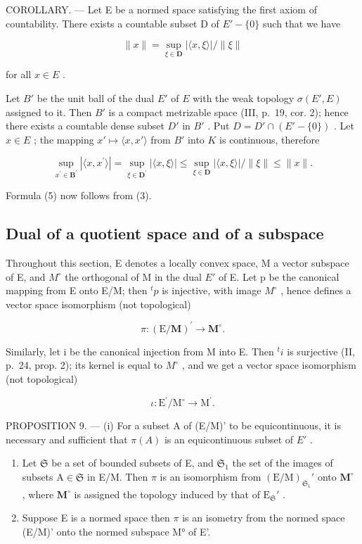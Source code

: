 COROLLARY. --- Let E be a normed space satisfying the first axiom of countability. There exists a countable subset D of \(E' - \{0\}\) such that we have

\[
\| x \| = \sup _ {\xi \in \mathbf {D}} | \langle x, \xi \rangle | / \| \xi \|\tag{5}
\]

for all \(x \in E\) .

Let \(B'\) be the unit ball of the dual \(E'\) of \(E\) with the weak topology \(\sigma(E', E)\) assigned to it. Then \(B'\) is a compact metrizable space (III, p.~19, cor. 2); hence there exists a countable dense subset \(D'\) in \(B'\) . Put \(D = D' \cap (E' - \{0\})\) . Let \(x \in E\) ; the mapping \(x' \mapsto \langle x, x' \rangle\) from \(B'\) into \(K\) is continuous, therefore

\[
\sup _ {x ^ {\prime} \in \mathbf {B} ^ {\prime}} | \langle x, x ^ {\prime} \rangle | = \sup _ {\xi \in \mathbf {D} ^ {\prime}} | \langle x, \xi \rangle | \leqslant \sup _ {\xi \in \mathbf {D}} | \langle x, \xi \rangle | / \| \xi \| \leqslant \| x \|.
\]

Formula (5) now follows from (3).

\subsection{Dual of a quotient space and of a subspace}

Throughout this section, E denotes a locally convex space, M a vector subspace of E, and \(M^{\circ}\) the orthogonal of M in the dual \(E'\) of E. Let p be the canonical mapping from E onto E/M; then \(^{t}p\) is injective, with image \(M^{\circ}\) , hence defines a vector space isomorphism (not topological)

\[
\pi : (\mathrm{E} / \mathbf {M}) ^ {\prime} \rightarrow \mathbf {M} ^ {\circ}.
\]

Similarly, let i be the canonical injection from M into E. Then \({}^{t}i\) is surjective (II, p.~24, prop. 2); its kernel is equal to \(M^{\circ}\) , and we get a vector space isomorphism (not topological)

\[
\iota : \mathrm{E} ^ {\prime} / \mathrm{M} ^ {\circ} \rightarrow \mathrm{M} ^ {\prime}.
\]

PROPOSITION 9. --- (i) For a subset A of (E/M)' to be equicontinuous, it is necessary and sufficient that \(\pi(A)\) is an equicontinuous subset of \(E'\) .

\begin{enumerate}
\def\labelenumi{(\roman{enumi})}
\setcounter{enumi}{1}
\item
  Let \(\mathfrak{S}\) be a set of bounded subsets of E, and \(\mathfrak{S}_1\) the set of the images of subsets \(\mathrm{A} \in \mathfrak{S}\) in E/M. Then \(\pi\) is an isomorphism from \((\mathrm{E} / \mathrm{M})_{\mathfrak{S}_1}'\) onto \(\mathbf{M}^\circ\) , where \(\mathbf{M}^\circ\) is assigned the topology induced by that of \(\mathrm{E}_{\mathfrak{S}}'\) .
\item
  Suppose E is a normed space then \(\pi\) is an isometry from the normed space (E/M)' onto the normed subspace M° of E'.
\end{enumerate}

